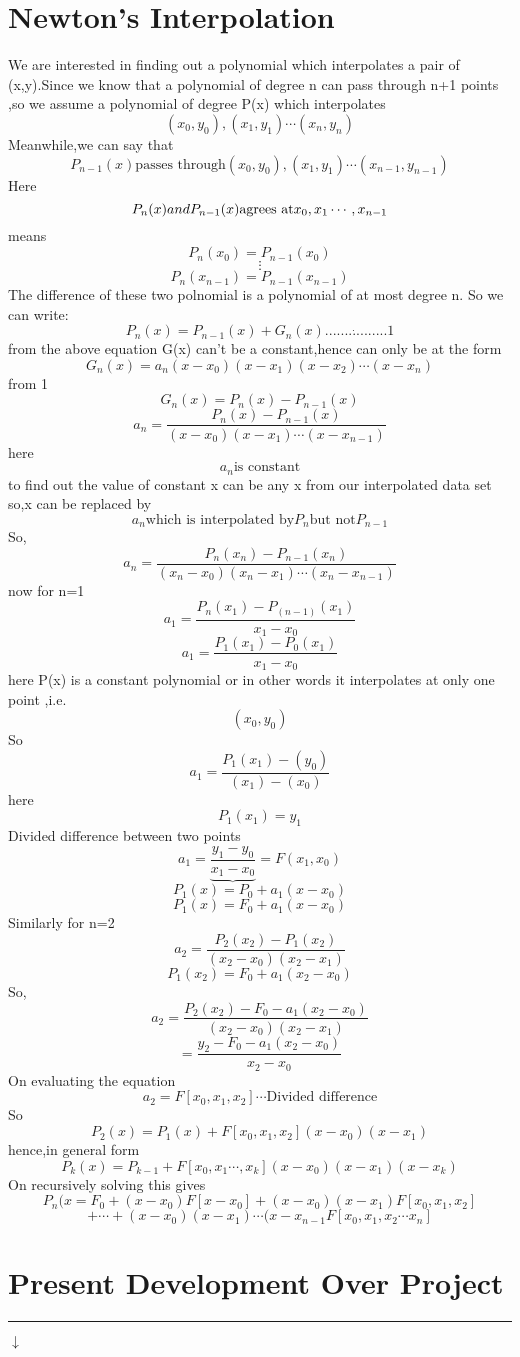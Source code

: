 \documentclass[a4paper, 12pt]{article}
\begin{document}
\section{Newton's Interpolation}
We are interested in finding out a polynomial which interpolates a pair of (x,y).Since we know that a polynomial of degree n can pass through n+1 points ,so we assume a polynomial of degree P(x) which interpolates \[(x_0,y_0),(x_1,y_1)\dotsb(x_n,y_n)\]Meanwhile,we can say that\[P_{n-1}(x) \text{passes through} (x_0,y_0),(x_1,y_1)\dotsb(x_{n-1},y_{n-1})\] Here \[P_n(x) \\and P_{n-1}(x) {\text{agrees at}} x_0,x_1\dotsb,x_{n-1}\]means
\[ P_n(x_0)=P_{n-1}(x_0)\]\[\vdots\]
\[P_n(x_{n-1})=P_{n-1}(x_{n-1})\]The difference of these two polnomial is a polynomial of at most degree n.
So we can write:\[P_n(x)=P_{n-1}(x)+G_n(x)  \dot{................} 1 \]from the above equation G(x) can't be a constant,hence can only be at the form\[G_n(x)=a_n(x-x_0)(x-x_1)(x-x_2)\dotsb(x-x_n)\]
from 1 \[G_n(x)=P_n(x)-P_{n-1}(x)\] \[a_n=\dfrac{P_n(x)-P_{n-1}(x)}{(x-x_0)(x-x_1)\dotsb(x-x_{n-1})}\] here \[a_n \text{is constant}\] to find out the value of constant x can be any x from our interpolated data set so,x can be replaced by \[a_n \text{which is interpolated by} P_n \text{but not} P_{n-1}\] So,
\[a_n=\dfrac{P_n(x_n)-P_{n-1}(x_n)}{(x_n-x_0)(x_n-x_1)\dotsb(x_n-x_{n-1})}\] now for n=1 \[a_1=\dfrac{P_n(x_1)-P_(n-1)(x_1)}{x_1-x_0}\] \[a_1=\dfrac{P_1(x_1)-P_0(x_1)}{x_1-x_0} \] here P(x) is a constant polynomial or in other words it interpolates at only one point ,i.e.\[(x_0,y_0)\] So \[a_1=\dfrac{P_1(x_1)-(y_0)}{(x_1)-(x_0)}\]here\[P_1(x_1)=y_1\] Divided difference between two points\[a_1=\underbrace{\dfrac{y_1-y_0}{x_1-x_0}}=F(x_1,x_0)\]\[P_1(x)=P_0+a_1(x-x_0)\]\[P_1(x)=F_0+a_1(x-x_0)\]Similarly for n=2
\[a_2=\dfrac{P_2(x_2)-P_1(x_2)}{(x_2-x_0)(x_2-x_1)}\] \[P_1(x_2)=F_0+a_1(x_2-x_0)\]So,
\[a_2=\dfrac{P_2(x_2)-F_0-a_1(x_2-x_0)}{(x_2-x_0)(x_2-x_1)}\]\[=\dfrac{y_2-F_0-a_1(x_2-x_0)}{x_2-x_0}\]On evaluating the equation \[a_2=F[x_0,x_1,x_2]\dotsb \text{Divided difference}\] So
\[P_2(x)=P_1(x)+F[x_0,x_1,x_2](x-x_0)(x-x_1)\]hence,in general form \[\boxed{P_k(x)=P_{k-1}+F[x_0,x_1\dotsb,x_k](x-x_0)(x-x_1)(x-x_k)}\]On recursively solving this gives \[P_n(x=F_0+(x-x_0)F[x-x_0]+(x-x_0)(x-x_1)F[x_0,x_1,x_2]\]\[+\dotsb+(x-x_0)(x-x_1)\dotsb(x-x_{n-1}F[x_0,x_1,x_2 \dotsb x_n]\]

\newpage
\section{Present Development Over Project}\hrule
$\downarrow$\\
\end{document}
